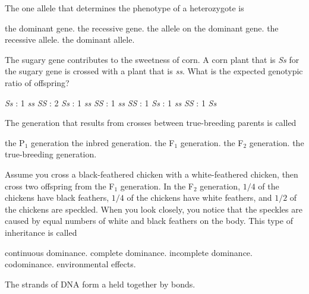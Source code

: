 \question
The one allele that determines the phenotype of a heterozygote is

\begin{choices}
\choice the dominant gene.
\choice the recessive gene.
\choice the allele on the dominant gene.
\choice the recessive allele.
\correctchoice the dominant allele.
\end{choices}

\question
The sugary gene contributes to the sweetness of corn. A corn plant that is \textit{Ss} for the sugary gene is crossed with a plant that is \textit{ss}. What is the expected genotypic ratio of offspring?

\begin{choices}
 \textit{Ss} : 1 \textit{ss}
 \textit{SS} : 2 \textit{Ss} : 1 \textit{ss}
 \textit{SS} : 1 \textit{ss}
 \textit{SS} : 1 \textit{Ss} : 1 \textit{ss}
 \textit{SS} : 1 \textit{Ss}
\end{choices}

\question
The generation that results from crosses between true-breeding parents is called

\begin{choices}
\choice the P$_1$ generation
\choice the inbred generation.
\correctchoice the F$_1$ generation.
\choice the F$_2$ generation.
\choice the true-breeding generation.
\end{choices}

\newpage

\question
Assume you cross a black-feathered chicken with a white-feathered chicken, then cross two offspring from the F$_1$ generation.  In the F$_2$ generation, $1/4$ of the chickens have black feathers, $1/4$ of the chickens have white feathers, and $1/2$ of the chickens are speckled.  When you look closely, you notice that the speckles are caused by equal numbers of white and black feathers on the body. This type of inheritance is called

\begin{choices}
\choice continuous dominance.
\choice complete dominance.
\choice incomplete dominance.
\correctchoice codominance.
\choice environmental effects.
\end{choices}

\question
The \underline{\hspace{2cm}} strands of DNA form a \underline{\hspace{2cm}} held together by \underline{\hspace{2cm}} bonds.


